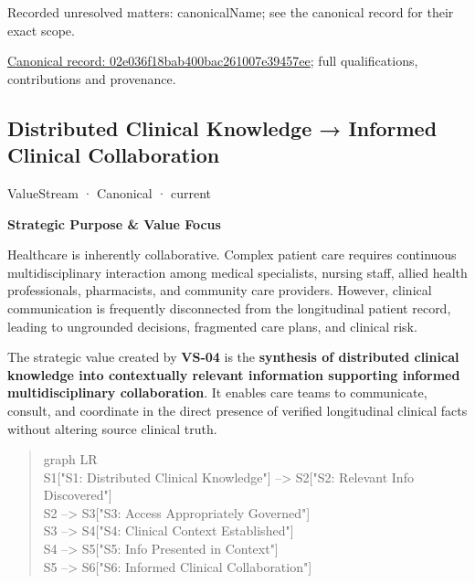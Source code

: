 {\small Recorded unresolved matters: canonicalName; see the canonical record for their exact scope.}\par
{\footnotesize \href{../../../../continuum/strategy/value-stream/02e036f18bab400bac261007e39457ee.md}{Canonical record: 02e036f18bab400bac261007e39457ee}; full qualifications, contributions and provenance.}\par
\subsection{Distributed Clinical Knowledge → Informed Clinical Collaboration}

\label{element:3ba98c0c1170458f8c02fa76694fee67}
{\small ValueStream · Canonical · current}\par

\par\medskip\textbf{Strategic Purpose \& Value Focus}\par


Healthcare is inherently collaborative. Complex patient care requires continuous multidisciplinary interaction among medical specialists, nursing staff, allied health professionals, pharmacists, and community care providers. However, clinical communication is frequently disconnected from the longitudinal patient record, leading to ungrounded decisions, fragmented care plans, and clinical risk.



The strategic value created by \textbf{VS-04} is the \textbf{synthesis of distributed clinical knowledge into contextually relevant information supporting informed multidisciplinary collaboration}. It enables care teams to communicate, consult, and coordinate in the direct presence of verified longitudinal clinical facts without altering source clinical truth.



\begin{quote}\small\ttfamily
graph LR\\
    S1["S1: Distributed Clinical Knowledge"] --> S2["S2: Relevant Info Discovered"]\\
    S2 --> S3["S3: Access Appropriately Governed"]\\
    S3 --> S4["S4: Clinical Context Established"]\\
    S4 --> S5["S5: Info Presented in Context"]\\
    S5 --> S6["S6: Informed Clinical Collaboration"]\\

\end{quote}


